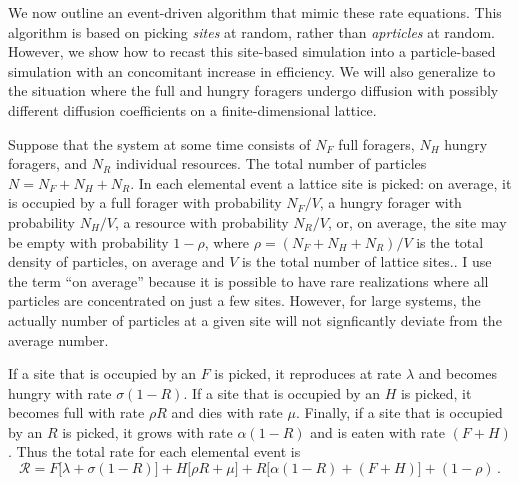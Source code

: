 \documentclass[11pt]{iopart}
\begin{document}
We now outline an event-driven algorithm that mimic these rate equations.
This algorithm is based on picking \emph{sites} at random, rather than
\emph{aprticles} at random.  However, we show how to recast this site-based
simulation into a particle-based simulation with an concomitant increase in
efficiency.  We will also generalize to the situation where the full and
hungry foragers undergo diffusion with possibly different diffusion
coefficients on a finite-dimensional lattice.  

Suppose that the system at some time consists of $N_F$ full foragers, $N_H$
hungry foragers, and $N_R$ individual resources.  The total number of
particles $N=N_F+N_H+N_R$.  In each elemental event a lattice site is picked:
on average, it is occupied by a full forager with probability $N_F/V$, a
hungry forager with probability $N_H/V$, a resource with probability $N_R/V$,
or, on average, the site may be empty with probability $1-\rho$, where
$\rho=(N_F+N_H+N_R)/V$ is the total density of particles, on average and $V$
is the total number of lattice sites..  I use the term ``on average'' because
it is possible to have rare realizations where all particles are concentrated
on just a few sites.  However, for large systems, the actually number of
particles at a given site will not signficantly deviate from the average
number.

If a site that is occupied by an $F$ is picked, it reproduces at rate
$\lambda$ and becomes hungry with rate $\sigma(1-R)$.  If a site that is
occupied by an $H$ is picked, it becomes full with rate $\rho R$ and dies
with rate $\mu$.  Finally, if a site that is occupied by an $R$ is picked, it
grows with rate $\alpha(1-R)$ and is eaten with rate $(F+H)$.  Thus the total
rate for each elemental event is
\begin{equation}
\mathcal{R}=F\big[\lambda +\sigma(1-R)\big]+ H\big[\rho R+\mu\big]+
R\big[\alpha(1-R)+(F+H)\big]+(1-\rho)\,.
\end{equation}
\end{document}
